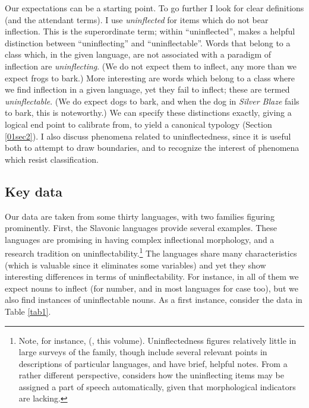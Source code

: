 \documentclass[output=paper,colorlinks,citecolor=brown]{langscibook}
\begin{document}
Our expectations can be a starting point. To go further I look for clear definitions (and the attendant terms). I use \textit{uninflected} for items which do not bear inflection. This is the superordinate term; within ``uninflected'', \citet[142]{spencer2020} makes a helpful distinction between ``uninflecting'' and ``uninflectable''. Words that belong to a class which, in the given language, are not associated with a paradigm of inflection are \textit{uninflecting}. (We do not expect them to inflect, any more than we expect frogs to bark.) More interesting are words which belong to a class where we find inflection in a given language, yet they fail to inflect; these are termed \textit{uninflectable}. (We do expect dogs to bark, and when the dog in \textit{Silver Blaze} fails to bark, this is noteworthy.) We can specify these distinctions exactly, giving a logical end point to calibrate from, to yield a canonical typology (Section \ref{01sec2}). I also discuss phenomena related to uninflectedness, since it is useful both to attempt to draw boundaries, and to recognize the interest of phenomena which resist classification.

\subsection{Key data} \label{01sec1.3}

Our data are taken from some thirty languages, with two families figuring prominently. First, the Slavonic languages provide several examples. These languages are promising in having complex inflectional morphology, and a research tradition on uninflectability.\footnote{Note, for instance, \citeauthor{doleschal2025} (\citeyear{doleschal2000, doleschal2002-mici, doleschal2002-aspekty, doleschal2008}, this volume). Uninflectedness figures relatively little in large surveys of the family, though \citet{comriecorbett1993} include several relevant points in descriptions of particular languages, and \citet[250--251]{sussexcubberley2006} have brief, helpful notes. From a rather different perspective, \citet{maldjieva1995} considers how the uninflecting items may be assigned a part of speech automatically, given that morphological indicators are lacking.} The languages share many characteristics (which is valuable since it eliminates some variables) and yet they show interesting differences in terms of uninflectability. For instance, in all of them we expect nouns to inflect (for number, and in most languages for case too), but we also find instances of uninflectable nouns. As a first instance, consider the data in Table \ref{tab1}.
\end{document}
